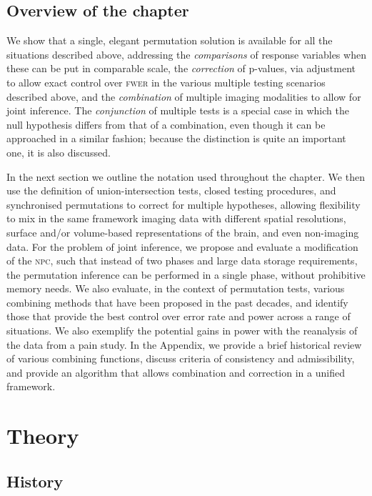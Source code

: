 \subsection{Overview of the chapter}

We show that a single, elegant permutation solution is available for all the situations described above, addressing the \emph{comparisons} of response variables when these can be put in comparable scale, the \emph{correction} of p-values, via adjustment to allow exact control over \textsc{fwer} in the various multiple testing scenarios described above, and the \emph{combination} of multiple imaging modalities to allow for joint inference. The \emph{conjunction} of multiple tests is a special case in which the null hypothesis differs from that of a combination, even though it can be approached in a similar fashion; because the distinction is quite an important one, it is also discussed.

In the next section we outline the notation used throughout the chapter. We then use the definition of union-intersection tests, closed testing procedures, and synchronised permutations to correct for multiple hypotheses, allowing flexibility to mix in the same framework imaging data with different spatial resolutions, surface and/or volume-based representations of the brain, and even non-imaging data. For the problem of joint inference, we propose and evaluate a modification of the \textsc{npc}, such that instead of two phases and large data storage requirements, the permutation inference can be performed in a single phase, without prohibitive memory needs. We also evaluate, in the context of permutation tests, various combining methods that have been proposed in the past decades, and identify those that provide the best control over error rate and power across a range of situations. We also exemplify the potential gains in power with the reanalysis of the data from a pain study. In the Appendix, we provide a brief historical review of various combining functions, discuss criteria of consistency and admissibility, and provide an algorithm that allows combination and correction in a unified framework.

\section{Theory}

\subsection{History}
\label{sec:comb:history}

